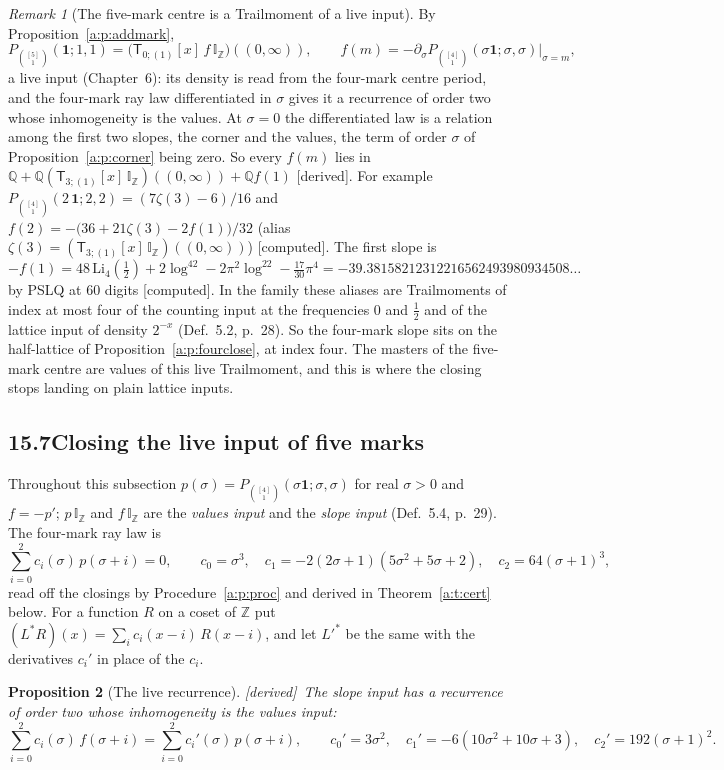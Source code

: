 \documentclass[11pt]{article}
\newcommand{\one}{\mathbf 1}
\newcommand{\sT}{\mathsf T}
\newcommand{\IZ}{\mathbb I_{\mathbb Z}}
\newcommand{\Tx}[3]{(\sT_{#1;(1)}[x]\,#2)((#3,\infty))}
\theoremstyle{plain}
\newtheorem{proposition}{Proposition}[section]
\theoremstyle{definition}
\theoremstyle{remark}
\newtheorem{remark}[proposition]{Remark}
\newcommand{\derived}{\textup{[derived]}}
\newcommand{\computed}{\textup{[computed]}}
\begin{document}
\begin{remark}[The five-mark centre is a Trailmoment of a live input]\label{a:r:live}
By Proposition~\ref{a:p:addmark},
\[
P_{\binom{[5]}1}(\one;1,1)=\big(\sT_{0;(1)}[x]\,f\,\IZ\big)((0,\infty)),\qquad f(m)=-\partial_\sigma P_{\binom{[4]}1}(\sigma\one;\sigma,\sigma)\big|_{\sigma=m},
\]
a live input (Chapter~6): its density is read from the four-mark centre period, and the four-mark ray law differentiated in $\sigma$ gives it a recurrence of order two whose inhomogeneity is the values. At $\sigma=0$ the differentiated law is a relation among the first two slopes, the corner and the values, the term of order $\sigma$ of Proposition~\ref{a:p:corner} being zero. So every $f(m)$ lies in $\mathbb Q+\mathbb Q\Tx{3}{\IZ}{0}+\mathbb Q f(1)$ \derived. For example $P_{\binom{[4]}1}(2\,\one;2,2)=(7\zeta(3)-6)/16$ and $f(2)=-\big(36+21\zeta(3)-2f(1)\big)/32$ (alias $\zeta(3)=\Tx{3}{\IZ}{0}$) \computed. The first slope is
\[
-f(1)=48\,\mathrm{Li}_4(\tfrac12)+2\log^42-2\pi^2\log^22-\tfrac{17}{30}\pi^4=-39.38158212312216562493980934508\ldots
\]
by PSLQ at $60$ digits \computed. In the family these aliases are Trailmoments of index at most four of the counting input at the frequencies $0$ and $\frac12$ and of the lattice input of density $2^{-x}$ (Def.~5.2, p.~28). So the four-mark slope sits on the half-lattice of Proposition~\ref{a:p:fourclose}, at index four. The masters of the five-mark centre are values of this live Trailmoment, and this is where the closing stops landing on plain lattice inputs.
\end{remark}

\subsection*{15.7\quad Closing the live input of five marks}

Throughout this subsection $p(\sigma)=P_{\binom{[4]}1}(\sigma\one;\sigma,\sigma)$ for real $\sigma>0$ and $f=-p'$; $p\,\IZ$ and $f\,\IZ$ are the \emph{values input} and the \emph{slope input} (Def.~5.4, p.~29). The four-mark ray law is
\[
\sum_{i=0}^2c_i(\sigma)\,p(\sigma+i)=0,\qquad c_0=\sigma^3,\quad c_1=-2(2\sigma+1)(5\sigma^2+5\sigma+2),\quad c_2=64(\sigma+1)^3,
\]
read off the closings by Procedure~\ref{a:p:proc} and derived in Theorem~\ref{a:t:cert} below. For a function $R$ on a coset of $\mathbb Z$ put $(L^\ast R)(x)=\sum_ic_i(x-i)\,R(x-i)$, and let $L'^\ast$ be the same with the derivatives $c_i'$ in place of the $c_i$.

\begin{proposition}[The live recurrence]\label{a:p:liverec}\derived\
The slope input has a recurrence of order two whose inhomogeneity is the values input:
\[
\sum_{i=0}^2c_i(\sigma)\,f(\sigma+i)=\sum_{i=0}^2c_i'(\sigma)\,p(\sigma+i),\qquad c_0'=3\sigma^2,\quad c_1'=-6(10\sigma^2+10\sigma+3),\quad c_2'=192(\sigma+1)^2 .
\]
\end{proposition}
\end{document}
